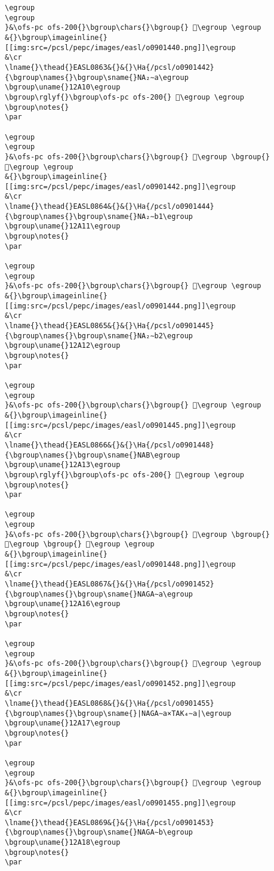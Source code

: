 \begin{verbatim}
\egroup
\egroup
}&\ofs-pc ofs-200{}\bgroup\chars{}\bgroup{} 𒨎\egroup \egroup
&{}\bgroup\imageinline{}[[img:src=/pcsl/pepc/images/easl/o0901440.png]]\egroup
&\cr
\lname{}\thead{}EASL0863&{}&{}\Ha{/pcsl/o0901442}{\bgroup\names{}\bgroup\sname{}NA₂∼a\egroup
\bgroup\uname{}12A10\egroup
\bgroup\rglyf{}\bgroup\ofs-pc ofs-200{} 𒨐\egroup \egroup
\bgroup\notes{}
\par 

\egroup
\egroup
}&\ofs-pc ofs-200{}\bgroup\chars{}\bgroup{} 𒨏\egroup \bgroup{} 𒨐\egroup \egroup
&{}\bgroup\imageinline{}[[img:src=/pcsl/pepc/images/easl/o0901442.png]]\egroup
&\cr
\lname{}\thead{}EASL0864&{}&{}\Ha{/pcsl/o0901444}{\bgroup\names{}\bgroup\sname{}NA₂∼b1\egroup
\bgroup\uname{}12A11\egroup
\bgroup\notes{}
\par 

\egroup
\egroup
}&\ofs-pc ofs-200{}\bgroup\chars{}\bgroup{} 𒨑\egroup \egroup
&{}\bgroup\imageinline{}[[img:src=/pcsl/pepc/images/easl/o0901444.png]]\egroup
&\cr
\lname{}\thead{}EASL0865&{}&{}\Ha{/pcsl/o0901445}{\bgroup\names{}\bgroup\sname{}NA₂∼b2\egroup
\bgroup\uname{}12A12\egroup
\bgroup\notes{}
\par 

\egroup
\egroup
}&\ofs-pc ofs-200{}\bgroup\chars{}\bgroup{} 𒨒\egroup \egroup
&{}\bgroup\imageinline{}[[img:src=/pcsl/pepc/images/easl/o0901445.png]]\egroup
&\cr
\lname{}\thead{}EASL0866&{}&{}\Ha{/pcsl/o0901448}{\bgroup\names{}\bgroup\sname{}NAB\egroup
\bgroup\uname{}12A13\egroup
\bgroup\rglyf{}\bgroup\ofs-pc ofs-200{} 𒨓\egroup \egroup
\bgroup\notes{}
\par 

\egroup
\egroup
}&\ofs-pc ofs-200{}\bgroup\chars{}\bgroup{} 𒨓\egroup \bgroup{} 𒨔\egroup \bgroup{} 𒨕\egroup \egroup
&{}\bgroup\imageinline{}[[img:src=/pcsl/pepc/images/easl/o0901448.png]]\egroup
&\cr
\lname{}\thead{}EASL0867&{}&{}\Ha{/pcsl/o0901452}{\bgroup\names{}\bgroup\sname{}NAGA∼a\egroup
\bgroup\uname{}12A16\egroup
\bgroup\notes{}
\par 

\egroup
\egroup
}&\ofs-pc ofs-200{}\bgroup\chars{}\bgroup{} 𒨖\egroup \egroup
&{}\bgroup\imageinline{}[[img:src=/pcsl/pepc/images/easl/o0901452.png]]\egroup
&\cr
\lname{}\thead{}EASL0868&{}&{}\Ha{/pcsl/o0901455}{\bgroup\names{}\bgroup\sname{}|NAGA∼a×TAK₄∼a|\egroup
\bgroup\uname{}12A17\egroup
\bgroup\notes{}
\par 

\egroup
\egroup
}&\ofs-pc ofs-200{}\bgroup\chars{}\bgroup{} 𒨗\egroup \egroup
&{}\bgroup\imageinline{}[[img:src=/pcsl/pepc/images/easl/o0901455.png]]\egroup
&\cr
\lname{}\thead{}EASL0869&{}&{}\Ha{/pcsl/o0901453}{\bgroup\names{}\bgroup\sname{}NAGA∼b\egroup
\bgroup\uname{}12A18\egroup
\bgroup\notes{}
\par 


\end{verbatim}
